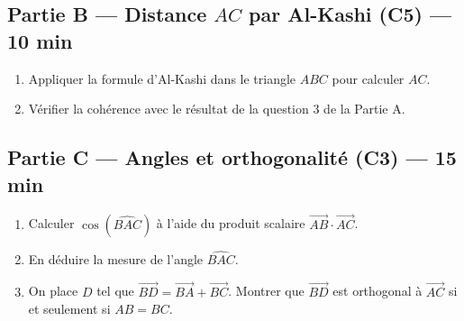 
\bigskip

\subsection*{Partie B — Distance $AC$ par Al-Kashi (C5) — 10 min}

\begin{enumerate}[resume]
  \item Appliquer la formule d'Al-Kashi dans le triangle $ABC$ pour calculer $AC$.
  \item Vérifier la cohérence avec le résultat de la question 3 de la Partie A.
\end{enumerate}


\bigskip

\subsection*{Partie C — Angles et orthogonalité (C3) — 15 min}

\begin{enumerate}[resume]
  \item Calculer $\cos(\widehat{BAC})$ à l'aide du produit scalaire $\overrightarrow{AB} \cdot \overrightarrow{AC}$.
  \item En déduire la mesure de l'angle $\widehat{BAC}$.
  \item On place $D$ tel que $\overrightarrow{BD} = \overrightarrow{BA} + \overrightarrow{BC}$. Montrer que $\overrightarrow{BD}$ est orthogonal à $\overrightarrow{AC}$ si et seulement si $AB = BC$.
\end{enumerate}

